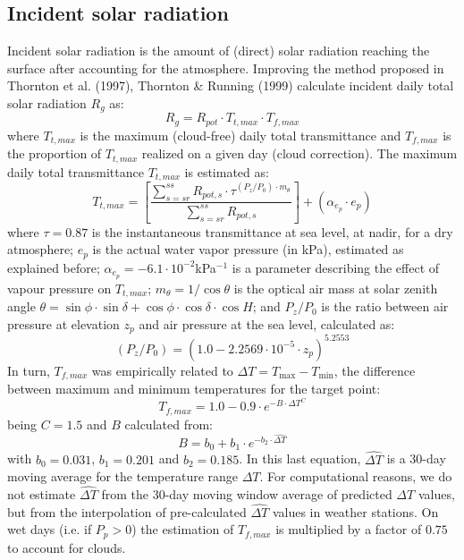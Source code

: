 \documentclass[11pt,a4paper]{article}
\begin{document}
\subsection{Incident solar radiation}
Incident solar radiation is the amount of (direct) solar radiation reaching the surface after accounting for the atmosphere. Improving the method proposed in Thornton et al. (1997), Thornton \& Running (1999) calculate incident daily total solar radiation $R_{g}$ as:
\begin{equation}
R_g = R_{pot} \cdot T_{t,max} \cdot T_{f,max}
\end{equation}
where $T_{t,max}$ is the maximum (cloud-free) daily total transmittance and $T_{f,max}$ is the proportion of $T_{t,max}$ realized on a given day (cloud correction). The maximum daily total transmittance $T_{t,max}$ is estimated as:
\begin{equation}
T_{t,max} = \left[\frac{\sum_{s = sr}^{ss}{R_{pot,s} \cdot \tau^{(P_z/P_0)\cdot m_{\theta}}}}{\sum_{s = sr}^{ss}{R_{pot,s}}}\right] + (\alpha_{e_p} \cdot {e_p})
\end{equation}
where $\tau = 0.87$ is the instantaneous transmittance at sea level, at nadir, for a dry atmosphere; ${e_p}$ is the actual water vapor pressure (in kPa), estimated as explained before; $\alpha_{e_p} = -6.1\cdot 10^{-2}$kPa$^{-1}$ is a parameter describing the effect of vapour pressure on $T_{t,max}$; $m_{\theta} = 1/\cos{\theta}$ is the optical air mass at solar zenith angle $\theta = \sin{\phi}\cdot \sin{\delta}+\cos{\phi}\cdot \cos{\delta} \cdot \cos{H}$; and $P_z/P_0$ is the ratio between air pressure at elevation $z_p$ and air pressure at the sea level, calculated as:
\begin{equation}
(P_z/P_0) = (1.0 -2.2569\cdot 10^{-5}\cdot z_p)^{5.2553}
\end{equation}
In turn, $T_{f,max}$ was empirically related to $\Delta T = T_{\max} - T_{\min}$, the difference between maximum and minimum temperatures for the target point:
\begin{equation}
T_{f,max} = 1.0 - 0.9\cdot e^{-B \cdot {\Delta T}^{C}}
\end{equation}
being $C = 1.5$ and $B$ calculated from:
\begin{equation}
B = b_0 + b_1 \cdot e^{-b_2 \cdot {\hat{\Delta T}}}
\end{equation}
with $b_0 = 0.031$, $b_1 = 0.201$ and $b_2 = 0.185$. In this last equation,  $\hat{\Delta T}$ is a 30-day moving average for the temperature range $\Delta T$. For computational reasons, we do not estimate $\hat{\Delta T}$ from the 30-day moving window average of predicted $\Delta T$ values, but from the interpolation of pre-calculated $\hat{\Delta T}$ values in weather stations. On wet days (i.e. if $P_p > 0$) the estimation of $T_{f,max}$ is multiplied by a factor of $0.75$ to account for clouds.
\end{document}
